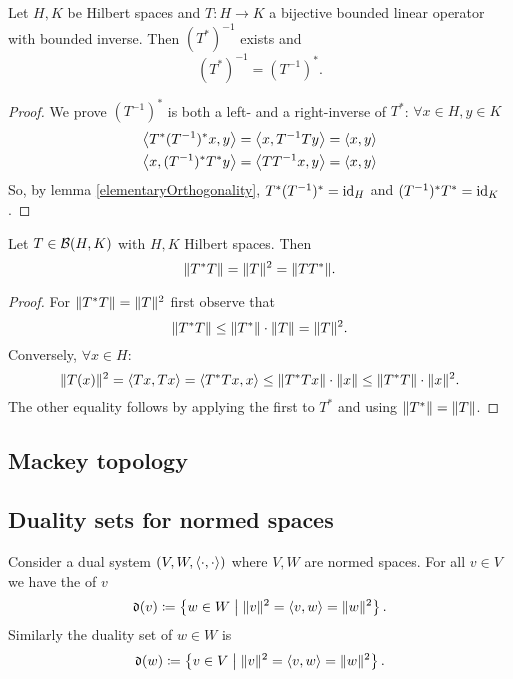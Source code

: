 \begin{proposition}
Let $H,K$ be Hilbert spaces and $T:H\to K$ a bijective bounded linear operator with bounded inverse. Then $(T^*)^{-1}$ exists and
\[ (T^*)^{-1} = (T^{-1})^*. \]
\end{proposition}
\begin{proof}
We prove $(T^{-1})^*$ is both a left- and a right-inverse of $T^*$: $\forall x\in H, y\in K$
\begin{align*}
\left\langle T^*(T^{-1})^*x,y \right\rangle &= \left\langle x,T^{-1}Ty \right\rangle = \left\langle x,y \right\rangle \\
\left\langle x,(T^{-1})^*T^*y \right\rangle &= \left\langle TT^{-1}x,y \right\rangle = \left\langle x,y \right\rangle
\end{align*}
So, by lemma \ref{elementaryOrthogonality}, $T^*(T^{-1})^* = \operatorname{id}_H$ and $(T^{-1})^*T^* = \operatorname{id}_K$.
\end{proof}

\begin{proposition} \label{normOfSquare}
Let $T\in \operatorname{\mathcal{B}}(H,K)$ with $H,K$ Hilbert spaces. Then
\[ \lVert T^*T\rVert= \lVert T\rVert^2 = \lVert TT^*\rVert. \]
\end{proposition}
\begin{proof}
For $\lVert T^*T\rVert= \lVert T\rVert^2$ first observe that
\[ \lVert T^*T\rVert \leq \lVert T^*\rVert\cdot\lVert T\rVert = \lVert T\rVert^2. \]
Conversely, $\forall x\in H$:
\[ \lVert T(x)\rVert^2 = \left\langle Tx,Tx \right\rangle = \left\langle T^*Tx,x \right\rangle \leq \lVert T^*Tx\rVert\cdot \lVert x\rVert \leq \lVert T^*T\rVert\cdot\lVert x\rVert^2. \]
The other equality follows by applying the first to $T^*$ and using $\lVert T^*\rVert=\lVert T\rVert$.
\end{proof}


\subsection{Mackey topology}

\begin{theorem}
\end{theorem}

\subsection{Duality sets for normed spaces}
\begin{definition}
Consider a dual system $\left( V, W, \left\langle \cdot,\cdot \right\rangle \right)$ where $V,W$ are normed spaces. For all $v\in V$ we have the  of $v$
\[ \mathfrak{d}(v) \coloneqq \left\{ w\in W \;\middle|\; \lVert v\rVert^2 = \left\langle v,w \right\rangle = \lVert w\rVert^2 \right\}. \]
Similarly the duality set of $w\in W$ is
\[ \mathfrak{d}(w) \coloneqq \left\{ v\in V \;\middle|\; \lVert v\rVert^2 = \left\langle v,w \right\rangle = \lVert w\rVert^2 \right\}. \]
\end{definition}

